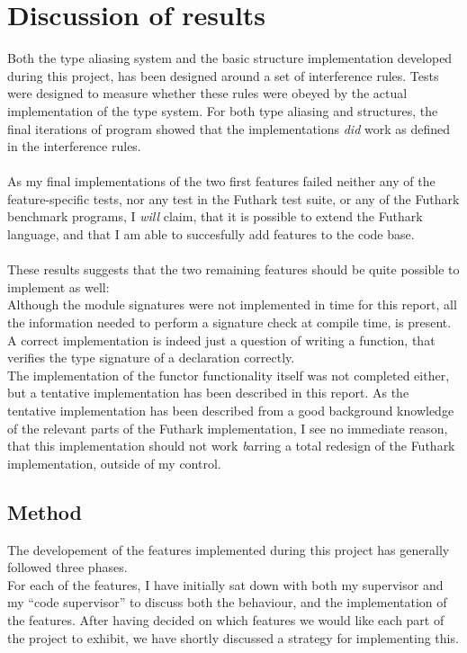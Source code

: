 \section{Discussion of results}
\label{sec:final_section}

Both the type aliasing system and the basic structure implementation developed
during this project, has been designed around a set of interference rules.
Tests were designed to measure whether these rules were obeyed by the actual
implementation of the type system.
For both type aliasing and structures, the final iterations of program showed
that the implementations \textit{did} work as defined in the interference rules.
\\
\\
As my final implementations of the two first features failed neither any of the
feature-specific tests, nor any test in the Futhark test suite, or any of the
Futhark benchmark programs\cite{futhark_benchmarks}, I \textit{will} claim, that
it is possible to extend the Futhark language, and that I am able to succesfully
add features to the code base.
\\
\\
These results suggests that the two remaining features should be quite possible
to implement as well:\\
Although the module signatures were not implemented in time for this report, all the information
needed to perform a signature check at compile time, is present. A correct
implementation is indeed just a question of writing a function, that verifies
the type signature of a declaration correctly.
\\
The implementation of the functor functionality itself was not completed either,
but a tentative implementation has been described in this report.
As the tentative implementation has been described from a good background knowledge
of the relevant parts of the Futhark implementation, I see no immediate reason,
that this implementation should not work \emph barring a total redesign of
the Futhark implementation, outside of my control.
\\

\subsection{Method}
\label{subsec:method}
The developement of the features implemented during this project has generally
followed three phases.\\
For each of the features, I have initially sat down with both my supervisor and
my ``code supervisor'' to discuss both the behaviour, and the implementation of
the features. After having decided on which features we would like each part of
the project to exhibit, we have shortly discussed a strategy for implementing
this.

